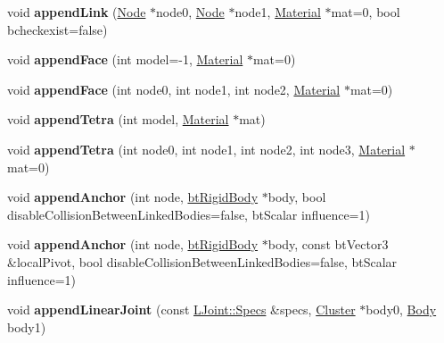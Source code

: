 \begin{DoxyCompactItemize}
\item 
\mbox{\label{classbtSoftBody_acf014be8167a550f227ae1b366ef3337}} 
void {\bfseries append\+Link} (\hyperlink{structbtSoftBody_1_1Node}{Node} $\ast$node0, \hyperlink{structbtSoftBody_1_1Node}{Node} $\ast$node1, \hyperlink{structbtSoftBody_1_1Material}{Material} $\ast$mat=0, bool bcheckexist=false)
\item 
\mbox{\label{classbtSoftBody_a1a89dadf0b4a8d9553d5e2263c034b07}} 
void {\bfseries append\+Face} (int model=-\/1, \hyperlink{structbtSoftBody_1_1Material}{Material} $\ast$mat=0)
\item 
\mbox{\label{classbtSoftBody_ad1fb030a3cce3125ba51533eaf6cb949}} 
void {\bfseries append\+Face} (int node0, int node1, int node2, \hyperlink{structbtSoftBody_1_1Material}{Material} $\ast$mat=0)
\item 
\mbox{\label{classbtSoftBody_a3d88c896f533e9ea942c746bee29711b}} 
void {\bfseries append\+Tetra} (int model, \hyperlink{structbtSoftBody_1_1Material}{Material} $\ast$mat)
\item 
\mbox{\label{classbtSoftBody_a9b56ea716ed865fdfb78aa2b2ec6952a}} 
void {\bfseries append\+Tetra} (int node0, int node1, int node2, int node3, \hyperlink{structbtSoftBody_1_1Material}{Material} $\ast$mat=0)
\item 
\mbox{\label{classbtSoftBody_a8c9cc03f89f85964af6b9252ecebba09}} 
void {\bfseries append\+Anchor} (int node, \hyperlink{classbtRigidBody}{bt\+Rigid\+Body} $\ast$body, bool disable\+Collision\+Between\+Linked\+Bodies=false, bt\+Scalar influence=1)
\item 
\mbox{\label{classbtSoftBody_a6390973cb20d6cf26bbaca4fa0eff5a3}} 
void {\bfseries append\+Anchor} (int node, \hyperlink{classbtRigidBody}{bt\+Rigid\+Body} $\ast$body, const bt\+Vector3 \&local\+Pivot, bool disable\+Collision\+Between\+Linked\+Bodies=false, bt\+Scalar influence=1)
\item 
\mbox{\label{classbtSoftBody_a265bfcce61012a940a03adf1dc412d1f}} 
void {\bfseries append\+Linear\+Joint} (const \hyperlink{structbtSoftBody_1_1LJoint_1_1Specs}{L\+Joint\+::\+Specs} \&specs, \hyperlink{structbtSoftBody_1_1Cluster}{Cluster} $\ast$body0, \hyperlink{structbtSoftBody_1_1Body}{Body} body1)

\end{DoxyCompactItemize}
